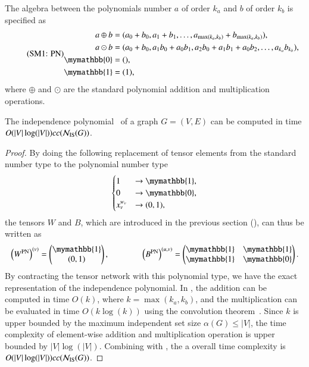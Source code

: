 \documentclass[review, onefignum, onetabnum]{siamart190516}
\begin{document}
The algebra between the polynomials number $a$ of order $k_a$ and $b$ of order $k_b$ is specified as
\begin{equation}
    \eqname{PN}
    \begin{split}
    a \oplus b &= (a_0 + b_0, a_1 + b_1, \ldots, a_{\max(k_a, k_b)} + b_{\max(k_a, k_b)}),\\
    a \odot b &= (a_0 + b_0, a_1b_0 + a_0b_1, a_{2}b_{0} + a_{1}b_{1} + a_{0}b_{2},  \ldots, a_{k_a} b_{k_b}),\\
    \mymathbb{0} &= (),  \\
    \mymathbb{1} &= (1), \label{eq:polynomial}
    \end{split}
\end{equation}
where $\oplus$ and $\odot$ are the standard polynomial addition and multiplication operations.

\begin{theorem}\label{thm:complexpoly}
    The independence polynomial~\cite{Harvey2018,Ferrin2014} of a graph $G = (V, E)$ can be computed in time $O(|V|\log(|V|))cc({\mathcal{N}_{\rm IS}(G)})$.
\end{theorem}
\begin{proof}
By doing the following replacement of tensor elements from the standard number type to the polynomial number type
\begin{equation}
    \begin{cases}
    1 &\rightarrow \mymathbb{1},\\
    0 &\rightarrow \mymathbb{0},\\
    x_v^{w_v} &\rightarrow (0, 1),
    \end{cases}
\end{equation}
the tensors $W$ and $B$, which are introduced in the previous section (), can thus be written as 
\begin{equation}
    \left(W^{\rm PN}\right)^{(v)} = \left(\begin{matrix}
        \mymathbb{1} \\
        (0,1)
    \end{matrix}\right),   
    \qquad \qquad
        \left(B^{\rm PN}\right)^{(u, v)} = \left(\begin{matrix}
        \mymathbb{1}  & \mymathbb{1} \\
        \mymathbb{1} & \mymathbb{0}
    \end{matrix}\right).
\end{equation}
By contracting the tensor network with this polynomial type, we have the exact representation of the independence polynomial.
In , the addition can be computed in time $O(k)$, where $k=\max(k_a, k_b)$, and the multiplication can be evaluated in time $O(k\log(k))$ using the convolution theorem~\cite{Schonhage1971}.
Since $k$ is upper bounded by the maximum independent set size $\alpha(G) \leq |V|$, the time complexity of element-wise addition and multiplication operation is upper bounded by $|V|\log(|V|)$. Combining with , the a overall time complexity is $O(|V|\log(|V|))cc({\mathcal{N}_{\rm IS}(G)})$.
\end{proof}
\end{document}
